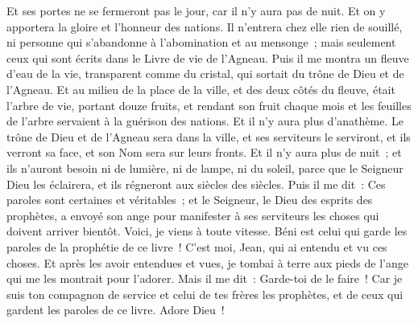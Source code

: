 \begin{multicols}{2}
Et ses portes ne se fermeront pas le jour, car il n'y aura pas de nuit.
Et on y apportera la gloire et l'honneur des nations.
Il n'entrera chez elle rien de souillé, ni personne qui s'abandonne à l'abomination et au mensonge~; mais seulement ceux qui sont écrits dans le Livre de vie de l'Agneau.
\VerseOne{}Puis il me montra un fleuve d'eau de la vie, transparent comme du cristal, qui sortait du trône de Dieu et de l'Agneau.
Et au milieu de la place de la ville, et des deux côtés du fleuve, était l'arbre de vie, portant douze fruits, et rendant son fruit chaque mois et les feuilles de l'arbre servaient à la guérison des nations.
Et il n'y aura plus d'anathème. Le trône de Dieu et de l'Agneau sera dans la ville, et ses serviteurs le serviront,
et ils verront sa face, et son Nom sera sur leurs fronts.
Et il n'y aura plus de nuit~; et ils n'auront besoin ni de lumière, ni de lampe, ni du soleil, parce que le Seigneur Dieu les éclairera, et ils régneront aux siècles des siècles.
Puis il me dit~: Ces paroles sont certaines et véritables~; et le Seigneur, le Dieu des esprits des prophètes, a envoyé son ange pour manifester à ses serviteurs les choses qui doivent arriver bientôt.
Voici, je viens à toute vitesse. Béni est celui qui garde les paroles de la prophétie de ce livre~!
C'est moi, Jean, qui ai entendu et vu ces choses. Et après les avoir entendues et vues, je tombai à terre aux pieds de l'ange qui me les montrait pour l'adorer.
Mais il me dit~: Garde-toi de le faire~! Car je suis ton compagnon de service et celui de tes frères les prophètes, et de ceux qui gardent les paroles de ce livre. Adore Dieu~!

\end{multicols}

